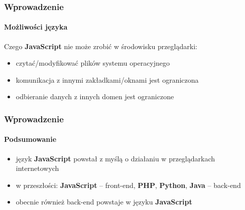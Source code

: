 \begin{frame}[fragile]
  \frametitle{Wprowadzenie}
  \framesubtitle{Możliwości języka}

  Czego \textbf{JavaScript} nie może zrobić w środowisku przeglądarki:
  \begin{itemize}
    \item czytać/modyfikować plików systemu operacyjnego
    \item komunikacja z innymi zakładkami/oknami jest ograniczona
    \item odbieranie danych z innych domen jest ograniczone
  \end{itemize}
\end{frame}


\begin{frame}[fragile]
  \frametitle{Wprowadzenie}
  \framesubtitle{Podsumowanie}

  \begin{itemize}
    \item język \textbf{JavaScript} powstał z myślą o działaniu w przeglądarkach internetowych
    \item w przeszłości: \textbf{JavaScript} -- front-end, \textbf{PHP}, \textbf{Python}, \textbf{Java} -- back-end
    \item obecnie również back-end powstaje w języku \textbf{JavaScript}
  \end{itemize}
\end{frame}






